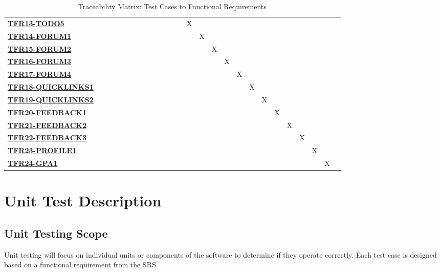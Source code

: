 \documentclass[12pt, titlepage]{article}
\begin{document}
\begin{enumerate}
\begin{table}[ht]
\begin{adjustbox}{width=1.2\textwidth}
\begin{tabular}{l|ccccccccccccccccccccccccc}
        \hyperref[TFR13-TODO5]{\textbf{TFR13-TODO5}} & & & & & & & & & & & & & X & & & & & & & & & & & \\
         \hyperref[TFR14-FORUM1]{\textbf{TFR14-FORUM1}} & & & & & & & & & & & & & & X & & & & & & & & & & \\
        \hyperref[TFR15-FORUM2]{\textbf{TFR15-FORUM2}} & & & & & & & & & & & & & & & X & & & & & & & & & \\
        \hyperref[TFR16-FORUM3]{\textbf{TFR16-FORUM3}} & & & & & & & & & & & & & & & & X & & & & & & & & \\
        \hyperref[TFR17-FORUM4]{\textbf{TFR17-FORUM4}} & & & & & & & & & & & & & & & & & X & & & & & & & \\
        \hyperref[TFR18-QUICKLINKS1]{\textbf{TFR18-QUICKLINKS1}} & & & & & & & & & & & & & & & & & & X & & & & & & \\
        \hyperref[TFR19-QUICKLINKS2]{\textbf{TFR19-QUICKLINKS2}} & & & & & & & & & & & & & & & & & & & X & & & & & \\
        \hyperref[TFR20-FEEDBACK1]{\textbf{TFR20-FEEDBACK1}} & & & & & & & & & & & & & & & & & & & & X & & & & \\
        \hyperref[TFR21-FEEDBACK2]{\textbf{TFR21-FEEDBACK2}} & & & & & & & & & & & & & & & & & & & & & X & & & \\
        \hyperref[TFR22-FEEDBACK3]{\textbf{TFR22-FEEDBACK3}} & & & & & & & & & & & & & & & & & & & & & & X & & \\
        \hyperref[TFR23-PROFILE1]{\textbf{TFR23-PROFILE1}} & & & & & & & & & & & & & & & & & & & & & & & X & \\
        \hyperref[TFR24-GPA1]{\textbf{TFR24-GPA1}} & & & & & & & & & & & & & & & & & & & & & & & & X \\
\hline
\end{tabular}
\end{adjustbox}
\caption{Traceability Matrix: Test Cases to Functional Requirements}
\end{table}




\pagestyle{plain}%
\clearpage

				
% 
\section{Unit Test Description}

\subsection{Unit Testing Scope}
Unit testing will focus on individual units or components of the software to determine if they operate correctly. Each test case is designed based on a functional requirement from the SRS.


\end{enumerate}
\end{document}
